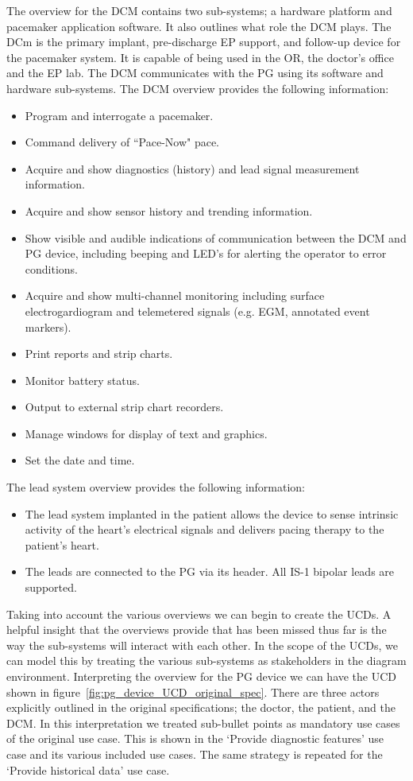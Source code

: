 The overview for the DCM contains two sub-systems; a hardware platform and pacemaker application software. It also outlines what role the DCM plays. The DCm is the primary implant, pre-discharge EP support, and follow-up device for the pacemaker system. It is capable of being used in the OR, the doctor's office and the EP lab. The DCM communicates with the PG using its software and hardware sub-systems. The DCM overview provides the following information:
\begin{itemize}
	\item Program and interrogate a pacemaker.
	\item Command delivery of ``Pace-Now" pace.
	\item Acquire and show diagnostics (history) and lead signal measurement information.
	\item Acquire and show sensor history and trending information.
	\item Show visible and audible indications of communication between the DCM and PG device, including beeping and LED's for alerting the operator to error conditions.
	\item Acquire and show multi-channel monitoring including surface electrogardiogram and telemetered signals (e.g. EGM, annotated event markers).
	\item Print reports and strip charts.
	\item Monitor battery status.
	\item Output to external strip chart recorders.
	\item Manage windows for display of text and graphics.
	\item Set the date and time.
\end{itemize}

The lead system overview provides the following information:
\begin{itemize}
	\item The lead system implanted in the patient allows the device to sense intrinsic activity of the heart's electrical signals and delivers pacing therapy to the patient's heart.
	\item The leads are connected to the PG via its header. All IS-1 bipolar leads are supported.
\end{itemize}

Taking into account the various overviews we can begin to create the UCDs. A helpful insight that the overviews provide that has been missed thus far is the way the sub-systems will interact with each other. In the scope of the UCDs, we can model this by treating the various sub-systems as stakeholders in the diagram environment. Interpreting the overview for the PG device we can have the UCD shown in figure~\ref{fig:pg_device_UCD_original_spec}. There are three actors explicitly outlined in the original specifications; the doctor, the patient, and the DCM. In this interpretation we treated sub-bullet points as mandatory use cases of the original use case. This is shown in the `Provide diagnostic features' use case and its various included use cases. The same strategy is repeated for the `Provide historical data' use case.

